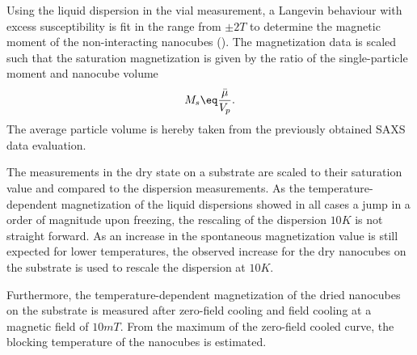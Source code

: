 \documentclass[\main/dresen_thesis.tex]{subfiles}
\begin{document}
    Using the liquid dispersion in the vial measurement, a Langevin behaviour with excess susceptibility is fit in the range from $\pm 2 \unit{T}$ to determine the magnetic moment of the non-interacting nanocubes ().
    The magnetization data is scaled such that the saturation magnetization is given by the ratio of the single-particle moment and nanocube volume
    \begin{align}
      M_s \eq \frac{\bar{\mu}}{V_p}.
    \end{align}
    The average particle volume is hereby taken from the previously obtained SAXS data evaluation.

    The measurements in the dry state on a substrate are scaled to their saturation value and compared to the dispersion measurements.
    As the temperature-dependent magnetization of the liquid dispersions showed in all cases a jump in a order of magnitude upon freezing, the rescaling of the dispersion $10 \unit{K}$ is not straight forward.
    As an increase in the spontaneous magnetization value is still expected for lower temperatures, the observed increase for the dry nanocubes on the substrate is used to rescale the dispersion at $10 \unit{K}$.

    Furthermore, the temperature-dependent magnetization of the dried nanocubes on the substrate is measured after zero-field cooling and field cooling at a magnetic field of $10 \unit{mT}$.
    From the maximum of the zero-field cooled curve, the blocking temperature of the nanocubes is estimated.
\end{document}
